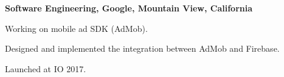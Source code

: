

\begin{myexp}
\item \textbf{Software Engineering, Google, Mountain View, California}
    \begin{mybullet}
    \item Working on mobile ad SDK (AdMob).
      \begin{mybullet}
        \item Designed and implemented the integration between AdMob and Firebase.
      \item Launched at IO 2017.
      \end{mybullet}
    \end{mybullet}


\end{myexp}
